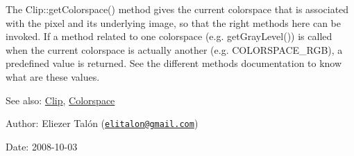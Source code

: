 The Clip::getColorspace() method gives the current colorspace that is associated with the pixel and its underlying image, so that the right methods here can be invoked. If a method related to one colorspace (e.g. getGrayLevel()) is called when the current colorspace is actually another (e.g. COLORSPACE\_\-RGB), a predefined value is returned. See the different methods documentation to know what are these values.

\begin{Desc}
\item[See also:]\hyperlink{class_clip}{Clip}, \hyperlink{_colorspace_8h_7a7e24cdb2a27271343f0adceff89f65}{Colorspace}\end{Desc}
\begin{Desc}
\item[Author:]Eliezer Talón (\href{mailto:elitalon@gmail.com}{\tt elitalon@gmail.com}) \end{Desc}
\begin{Desc}
\item[Date:]2008-10-03 \end{Desc}


